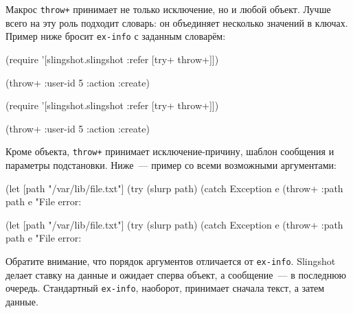 Макрос \verb|throw+| принимает не только исключение, но и любой объект. Лучше
всего на эту роль подходит словарь: он объединяет несколько значений в
ключах. Пример ниже бросит \verb|ex-info| с заданным словарём:

\ifnarrow

\begin{english}
  \begin{clojure}
(require
  '[slingshot.slingshot
    :refer [try+ throw+]])

(throw+ {:user-id 5 :action :create})
  \end{clojure}
\end{english}

\else

\begin{english}
  \begin{clojure}
(require '[slingshot.slingshot :refer [try+ throw+]])

(throw+ {:user-id 5 :action :create})
  \end{clojure}
\end{english}

\fi

Кроме объекта, \verb|throw+| принимает исклю\-че\-ние-при\-чи\-ну, шаблон
сообщения и параметры подстановки. Ниже~--- пример со всеми возможными
аргументами:

\pagebreakafive[3]

\ifnarrow

\begin{english}
  \begin{clojure}
(let [path "/var/lib/file.txt"]
  (try
    (slurp path)
    (catch Exception e
      (throw+ {:path path} e
      "File error: %
  \end{clojure}
\end{english}

\else

\begin{english}
  \begin{clojure}
(let [path "/var/lib/file.txt"]
  (try
    (slurp path)
    (catch Exception e
      (throw+ {:path path} e "File error: %
  \end{clojure}
\end{english}

\fi

Обратите внимание, что порядок аргументов отличается от
\verb|ex-info|. Slingshot делает ставку на данные и ожидает сперва объект, а
сообщение~--- в последнюю очередь. Стандартный \verb|ex-info|, наоборот,
принимает сначала текст, а затем данные.

